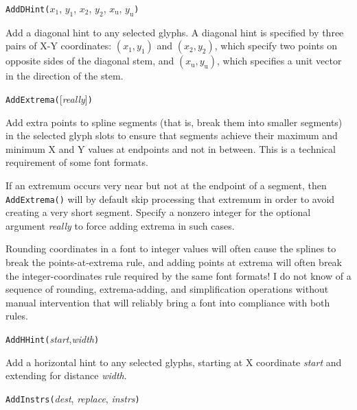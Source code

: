 

\texttt{AddDHint(}$x_1$, $y_1$, $x_2$, $y_2$, $x_\mathrm{u}$,
  $y_\mathrm{u}$\texttt{)}

Add a diagonal hint to any selected glyphs.  A diagonal hint is specified by
three pairs of X-Y coordinates:  $(x_1,y_1)$ and $(x_2,y_2)$, which specify
two points on opposite sides of the diagonal stem, and
$(x_\mathrm{u},y_\mathrm{u})$, which
specifies a unit vector in the direction of the stem.



\texttt{AddExtrema(}[\textit{really}]\texttt{)}

Add extra points to spline segments (that is, break them into smaller
segments) in the selected glyph slots to ensure that segments achieve their
maximum and minimum X and Y values at endpoints and not in between. 
This is a technical requirement of some font formats.

If an extremum occurs very near but not at the endpoint of a segment, then
\texttt{AddExtrema()} will by default skip processing that extremum in order
to avoid creating a very short segment.  Specify a nonzero integer for the
optional argument \textit{really} to force adding extrema in such cases.

Rounding coordinates in a font to integer values will often cause the
splines to break the points-at-extrema rule, and adding points at extrema
will often break the integer-coordinates rule required by the same font
formats!  I do not know of a sequence of rounding, extrema-adding, and
simplification operations without manual intervention that will reliably
bring a font into compliance with both rules.



\texttt{AddHHint(}\textit{start},\textit{width}\texttt{)}

Add a horizontal hint to any selected glyphs, starting at X coordinate
\textit{start} and extending for distance \textit{width}.



\texttt{AddInstrs(}\textit{dest}, \textit{replace}, \textit{instrs}\texttt{)}

